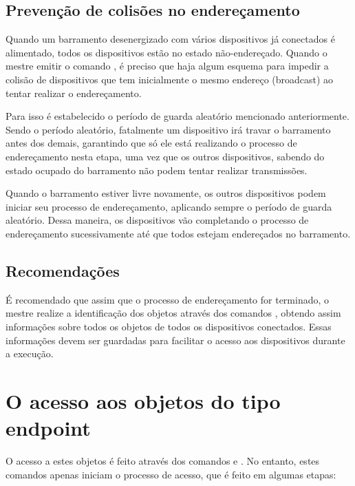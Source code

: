 \documentclass[11pt]{report}
\begin{document}
\subsection{Prevenção de colisões no endereçamento}

Quando um barramento desenergizado com vários dispositivos já conectados é alimentado, todos os dispositivos estão no estado não-endereçado. Quando o mestre emitir o comando , é preciso que haja algum esquema para impedir a colisão de dispositivos que tem inicialmente o mesmo endereço (broadcast) ao tentar realizar o endereçamento.

Para isso é estabelecido o período de guarda aleatório mencionado anteriormente. Sendo o período aleatório, fatalmente um dispositivo irá travar o barramento antes dos demais, garantindo que só ele está realizando o processo de endereçamento nesta etapa, uma vez que os outros dispositivos, sabendo do estado ocupado do barramento não podem tentar realizar transmissões.

Quando o barramento estiver livre novamente, os outros dispositivos podem iniciar seu processo de endereçamento, aplicando sempre o período de guarda aleatório. Dessa maneira, os dispositivos vão completando o processo de endereçamento sucessivamente até que todos estejam endereçados no barramento.

\subsection{Recomendações}

É recomendado que assim que o processo de endereçamento for terminado, o mestre realize a identificação dos objetos através dos comandos , obtendo assim informações sobre todos os objetos de todos os dispositivos conectados. Essas informações devem ser guardadas para facilitar o acesso aos dispositivos durante a execução.

\section{O acesso aos objetos do tipo endpoint}

O acesso a estes objetos é feito através dos comandos  e . No entanto, estes comandos apenas iniciam o processo de acesso, que é feito em algumas etapas:
\end{document}
